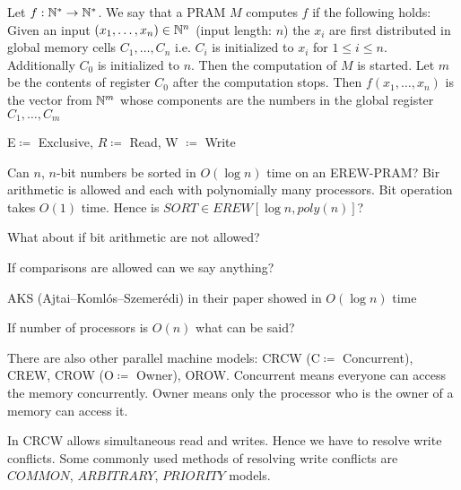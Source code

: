 Let $f:\mathbb{N}^*\to \mathbb{N}^*$. We say that a PRAM $M$ computes $f$ if the following holds: Given an input $(x_1,\dots,x_n)\in \mathbb{N}^n$ (input length: $n$) the $x_i$ are first distributed in global memory cells $C_1,\dots, C_n$ i.e. $C_i$ is initialized to $x_i$ for $1\leq i\leq n$. Additionally $C_0$ is initialized to $n$. Then the computation of $M$ is started. Let $m$ be the contents of register $C_0$ after the computation stops. Then $f(x_1,\dots, x_n)$ is the vector from $\mathbb{N}^m$ whose components are the numbers in the global register $C_1,\dots, C_m$
\begin{definition}
	E$\coloneqq$ Exclusive, $R\coloneqq$ Read, W $\coloneqq $ Write 
\end{definition}
\begin{question}
	Can $n$, $n$-bit numbers be sorted in $O(\log n)$ time on an EREW-PRAM? Bir arithmetic is allowed and each with polynomially many processors. Bit operation takes $O(1)$ time. Hence is $SORT\in EREW[\log n,poly(n)]$?
\end{question}

\begin{question}
	What about if bit arithmetic are not allowed?
\end{question}
\begin{question}
	If comparisons are allowed can we say anything?
\end{question}
\begin{answer}
	AKS (Ajtai–Koml\'{o}s–Szemer\'{e}di) in their paper \cite{akssortparallel} showed in $O(\log n)$ time
\end{answer}

\begin{question}
	If number of processors is $O(n)$ what can be said?
\end{question}
There are also other parallel machine models: CRCW (C$\coloneqq$ Concurrent), CREW, CROW (O$\coloneqq$ Owner), OROW. Concurrent means everyone can access the memory concurrently. Owner means only the processor who is the owner of a memory can access it. 

In CRCW allows simultaneous read and writes. Hence we have to resolve write conflicts. Some commonly used methods of resolving write conflicts are $COMMON$, $ARBITRARY$, $PRIORITY$ models.  

